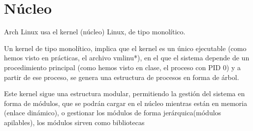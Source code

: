\documentclass[12pt, spanish]{article}
\begin{document}
\section{Núcleo}

Arch Linux usa el kernel (núcleo) Linux, de tipo monolítico.

Un kernel de tipo monolítico, implica que el kernel es un único ejecutable (como hemos visto en prácticas, el archivo  vmlinu*), en el que el sistema depende de un procedimiento principal (como hemos visto en clase, el proceso con PID 0) y a partir de ese proceso, se genera una estructura de procesos en forma de árbol.


Este kernel sigue una estructura modular, permitiendo la gestión del sistema en forma de módulos, que se podrán cargar en el núcleo mientras están en memoria (enlace dinámico), o gestionar los módulos de forma jerárquica(módulos apilables), los módulos sirven como bibliotecas


\vspace{5cm}




\end{document}
